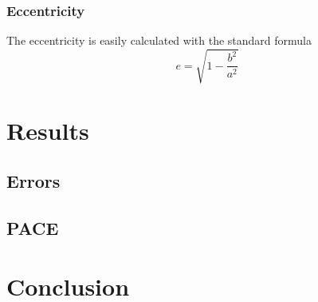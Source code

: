 \documentclass[a4paper,12pt]{article} %
\numberwithin{equation}{section} %
\numberwithin{figure}{section} %
\begin{document}
\subsubsection{Eccentricity}

The eccentricity is easily calculated with the standard formula $$e=\sqrt{1-\frac{b^2}{a^2}}$$

\section{Results}

\subsection{Errors}

\subsection{PACE}


\section{Conclusion}
\end{document}
